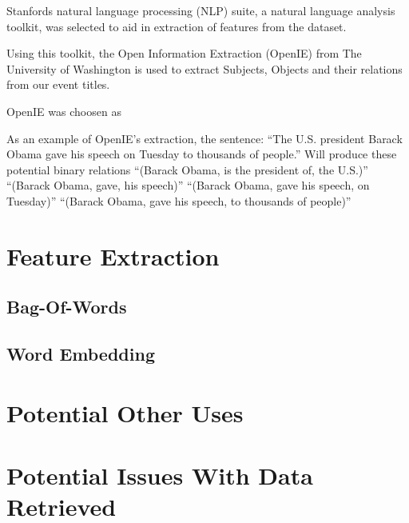 \documentclass[bsc,frontabs,twoside,singlespacing,parskip,deptreport]{infthesis}     %
\begin{document}
Stanfords natural language processing (NLP) suite,
a natural language analysis toolkit,
was selected to aid in extraction of features from the dataset.

Using this toolkit, the Open Information Extraction (OpenIE) from
The University of Washington is used to extract Subjects, Objects
and their relations from our event titles.

OpenIE was choosen as %

As an example of OpenIE's extraction, the sentence:
``The U.S. president Barack Obama gave his speech on Tuesday to thousands of people.''
Will produce these potential binary relations
``(Barack Obama, is the president of, the U.S.)''
``(Barack Obama, gave, his speech)''
``(Barack Obama, gave his speech, on Tuesday)''
``(Barack Obama, gave his speech, to thousands of people)''


\section{Feature Extraction}
\subsection{Bag-Of-Words}
\subsection{Word Embedding}
\section{Potential Other Uses}
\section{Potential Issues With Data Retrieved}


\end{document}
